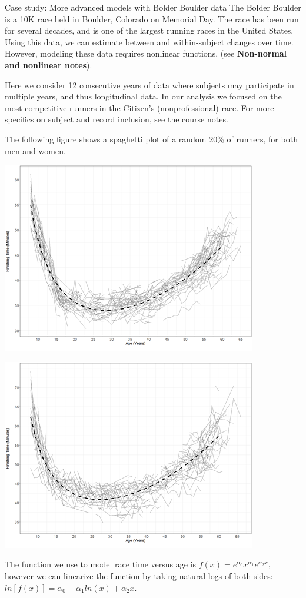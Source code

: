 \documentclass[
  9pt,
  ignorenonframetext,
]{beamer}
\begin{document}
\begin{frame}{Case study: More advanced models with Bolder Boulder data}
\protect\hypertarget{case-study-more-advanced-models-with-bolder-boulder-data}{}
The Bolder Boulder is a 10K race held in Boulder, Colorado on Memorial
Day. The race has been run for several decades, and is one of the
largest running races in the United States. Using this data, we can
estimate between and within-subject changes over time. However, modeling
these data requires nonlinear functions, (see \textbf{Non-normal and
nonlinear notes}).

Here we consider 12 consecutive years of data where subjects may
participate in multiple years, and thus longitudinal data. In our
analysis we focused on the most competitive runners in the Citizen's
(nonprofessional) race. For more specifics on subject and record
inclusion, see the course notes.
\end{frame}

\begin{frame}{}
\protect\hypertarget{section-5}{}
The following figure shows a spaghetti plot of a random 20\% of runners,
for both men and women.

\begin{center}\includegraphics[width=0.4\linewidth]{figs_L19/f2} \end{center}

\begin{center}\includegraphics[width=0.4\linewidth]{figs_L19/f3} \end{center}

The function we use to model race time versus age is
\(f(x)=e^{\alpha _0 } x^{\alpha _1 } e^{\alpha _2x }\), however we can
linearize the function by taking natural logs of both sides:
\(ln⁡[f(x)]=\alpha _0+\alpha _1 ln⁡(x)+\alpha _2 x\).
\end{frame}
\end{document}
